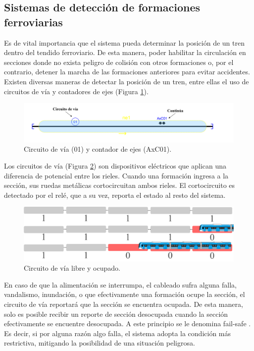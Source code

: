 \subsection{Sistemas de detección de formaciones ferroviarias}
    \label{sec:detectors}
    
    Es de vital importancia que el sistema pueda determinar la posición de un tren dentro del tendido ferroviario. De esta manera, poder habilitar la circulación en secciones donde no exista peligro de colisión con otros formaciones o, por el contrario, detener la marcha de las formaciones anteriores para evitar accidentes. Existen diversas maneras de detectar la posición de un tren, entre ellas el uso de circuitos de vía y contadores de ejes (Figura \ref{fig:deteccion_1}). 

    \begin{figure}[H]
        \centering
        \includegraphics[width=1\textwidth]{Figuras/detector}
        \centering\caption{Circuito de vía (01) y contador de ejes (AxC01).}
        \label{fig:deteccion_1}
    \end{figure}

    Los circuitos de vía (Figura \ref{fig:deteccion_2}) son dispositivos eléctricos que aplican una diferencia de potencial entre los rieles. Cuando una formación ingresa a la sección, sus ruedas metálicas cortocircuitan ambos rieles. El cortocircuito es detectado por el relé, que a su vez, reporta el estado al resto del sistema. 

    \begin{figure}[H]
        \centering
        \includegraphics[width=1\textwidth]{Figuras/circuitoVia}
        \centering\caption{Circuito de vía libre y ocupado.}
        \label{fig:deteccion_2}
    \end{figure}

    En caso de que la alimentación se interrumpa, el cableado sufra alguna falla, vandalismo, inundación, o que efectivamente una formación ocupe la sección, el circuito de vía reportará que la sección se encuentra ocupada. De esta manera, solo es posible recibir un reporte de sección desocupada cuando la sección efectivamente se encuentre desocupada. A este principio se le denomina fail-safe \cite{Paper_5,Paper_94,Paper_95,Paper_96}. Es decir, si por alguna razón algo falla, el sistema adopta la condición más restrictiva, mitigando la posibilidad de una situación peligrosa. 
    
